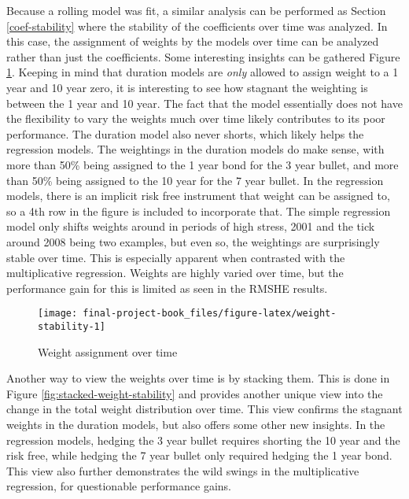 \documentclass[openany]{book}
\theoremstyle{definition}
\theoremstyle{definition}
\theoremstyle{definition}
\theoremstyle{remark}
\begin{document}
\normalsize

\small

\normalsize

Because a rolling model was fit, a similar analysis can be performed as
Section \ref{coef-stability} where the stability of the coefficients
over time was analyzed. In this case, the assignment of weights by the
models over time can be analyzed rather than just the coefficients. Some
interesting insights can be gathered Figure \ref{fig:weight-stability}.
Keeping in mind that duration models are \emph{only} allowed to assign
weight to a 1 year and 10 year zero, it is interesting to see how
stagnant the weighting is between the 1 year and 10 year. The fact that
the model essentially does not have the flexibility to vary the weights
much over time likely contributes to its poor performance. The duration
model also never shorts, which likely helps the regression models. The
weightings in the duration models do make sense, with more than 50\%
being assigned to the 1 year bond for the 3 year bullet, and more than
50\% being assigned to the 10 year for the 7 year bullet. In the
regression models, there is an implicit risk free instrument that weight
can be assigned to, so a 4th row in the figure is included to
incorporate that. The simple regression model only shifts weights around
in periods of high stress, 2001 and the tick around 2008 being two
examples, but even so, the weightings are surprisingly stable over time.
This is especially apparent when contrasted with the multiplicative
regression. Weights are highly varied over time, but the performance
gain for this is limited as seen in the RMSHE results.

\small

\begin{figure}[H]

{\centering \texttt{[image: final-project-book\_files/figure-latex/weight-stability-1]} 

}

\caption{Weight assignment over time}\label{fig:weight-stability}
\end{figure}

\normalsize

Another way to view the weights over time is by stacking them. This is
done in Figure \ref{fig:stacked-weight-stability} and provides another
unique view into the change in the total weight distribution over time.
This view confirms the stagnant weights in the duration models, but also
offers some other new insights. In the regression models, hedging the 3
year bullet requires shorting the 10 year and the risk free, while
hedging the 7 year bullet only required hedging the 1 year bond. This
view also further demonstrates the wild swings in the multiplicative
regression, for questionable performance gains.
\end{document}
